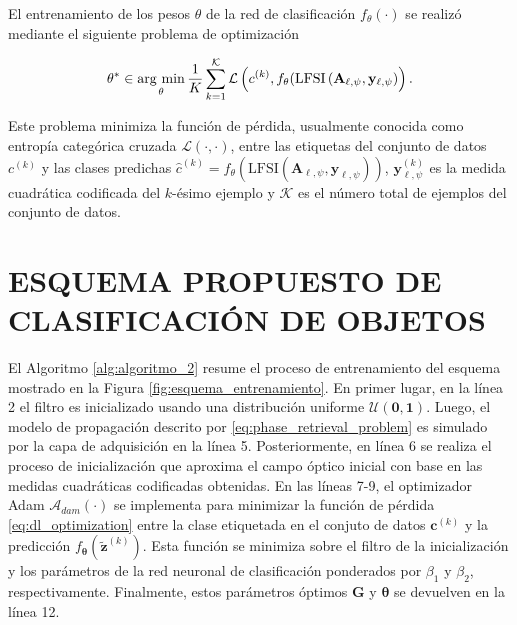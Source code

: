 El entrenamiento de los pesos $\theta$ de la red de clasificación $f_\theta(\cdot)$ se realizó mediante el siguiente problema de optimización

\begin{equation}
    \mathbf{\theta}^* \in  \operatorname*{arg \ min}_{\mathbf{\theta}} \frac{1}{K}\sum_{k = 1}^{\mathcal{K}} \mathcal{L}\left( c^{(k)}, f_\theta(\mathrm{LFSI}\left(\mathbf{A}_{\ell,\psi},\mathbf{y}_{\ell, \psi}\right)\right).
    \label{eq:dl_optimization}
\end{equation}

Este problema minimiza la función de pérdida, usualmente conocida como entropía categórica cruzada $\mathcal{L}(\cdot, \cdot)$, entre las etiquetas del conjunto de datos $c^{(k)}$ y las clases predichas $\hat{c}^{(k)} = f_\theta(\mathrm{LFSI}\left(\mathbf{A}_{\ell,\psi},\mathbf{y}_{\ell, \psi}\right))$, $\mathbf{y}_{\ell, \psi}^{(k)}$ es la medida cuadrática codificada del $k$-ésimo ejemplo y $\mathcal{K}$ es el número total de ejemplos del conjunto de datos.


\section{ESQUEMA PROPUESTO DE CLASIFICACIÓN DE OBJETOS}

El Algoritmo \ref{alg:algoritmo_2} resume el proceso de entrenamiento del esquema mostrado en la Figura \ref{fig:esquema_entrenamiento}. En primer lugar, en la línea 2 el filtro es inicializado usando una distribución uniforme $\mathcal{U}(\mathbf{0},\mathbf{1})$. Luego, el modelo de propagación descrito por \eqref{eq:phase_retrieval_problem} es simulado por la capa de adquisición en la línea 5. Posteriormente, en línea 6 se realiza el proceso de inicialización que aproxima el campo óptico inicial con base en las medidas cuadráticas codificadas obtenidas. En las líneas 7-9, el optimizador Adam $\mathcal{A}_{dam}(\cdot)$ se implementa para minimizar la función de pérdida \eqref{eq:dl_optimization} entre la clase etiquetada en el conjuto de datos ${\mathbf{c}}^{(k)}$ y la predicción $f_{\boldsymbol{\theta}}\left(\tilde{\mathbf{z}}^{(k)}\right)$. Esta función se minimiza sobre el filtro de la inicialización y los parámetros de la red neuronal de clasificación ponderados por $\beta_1$ y $\beta_2$, respectivamente. Finalmente, estos parámetros óptimos $\mathbf{G}$ y $\boldsymbol{\theta}$ se devuelven en la línea 12.



